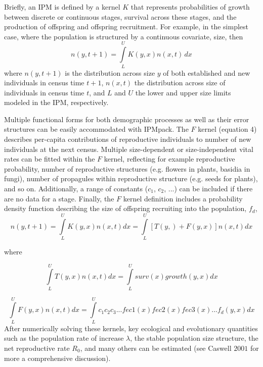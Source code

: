 \documentclass{article}
\begin{document}
Briefly, an IPM is defined by a kernel $K$ that represents probabilities of growth between discrete or continuous stages, survival across these stages, and the production of offspring and offspring recruitment.   For example, in the simplest case, where the population is structured by a continuous covariate, size, then 
\begin{equation}
n(y, t+1) = \int\limits_{L}^{U} K(y, x) n(x, t) \, dx       
\end{equation}
where $n(y, t+1)$ is the distribution across size $y$ of both established and new individuals in census time $t+1$, $n(x, t)$ the distribution across size of individuals in census time $t$, and $L$ and $U$ the lower and upper size limits modeled in the IPM, respectively. 

 Multiple functional forms for both demographic processes as well as their error structures can be easily accommodated with IPMpack. The $F$ kernel (equation 4) describes per-capita contributions of reproductive individuals to number of new individuals at the next census. Multiple size-dependent or size-independent vital rates can be fitted within the $F$ kernel, reflecting for example reproductive probability, number of reproductive structures (e.g. flowers in plants, basidia in fungi), number of propagules within reproductive structure (e.g. seeds for plants), and so on. Additionally, a range of constants ($c_1$, $c_2$, ...) can be included if there are no data for a stage.  Finally, the $F$ kernel definition includes a probability density function describing the size of offspring recruiting into the population, $f_d$, 
\begin{equation}
n(y, t+1) = \int\limits_{L}^{U} K(y, x) n(x, t) dx = \int\limits_{L}^{U}
[T(y, ) + F(y, x)] n(x, t) dx
\end{equation}

where

\begin{equation}
 \int\limits_{L}^{U} T(y, x) n(x, t) dx = \int\limits_{L}^{U}surv(x)growth(y, x)dx    
\end{equation}

\begin{equation}
 \int\limits_{L}^{U} F(y, x) n(x, t) dx = \int\limits_{L}^{U}
c_1 c_2 c_3 ... fec1(x)fec2(x)fec3(x)...f_d(y, x)dx     
\end{equation}
After numerically solving these kernels, key ecological and evolutionary quantities such as the population rate of increase $\lambda$, the stable population size structure, the net reproductive rate $R_0$, and many others can be estimated (see Caswell $2001$ for more a comprehensive discussion). 
\end{document}
